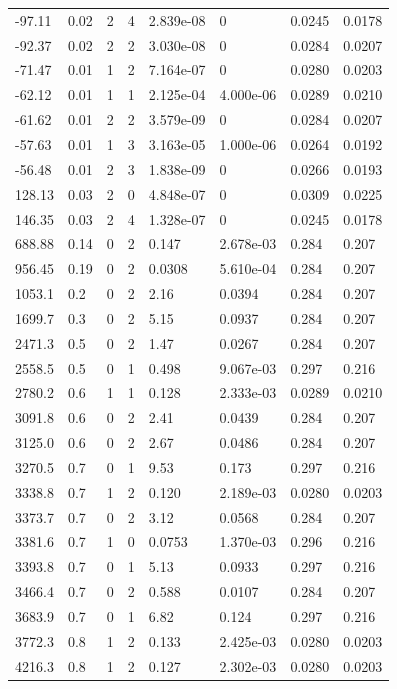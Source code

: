\documentclass[preview]{standalone}
\begin{document}
{{\begin{tabular}{L{1.2cm}C{1.2cm} C{0.3cm}C{0.5cm} C{1.4cm}C{1.4cm} C{1.4cm}C{1.4cm}}
  -97.11  &  0.02  & 2     &  4 &  2.839e-08  & 0  & 0.0245 &  0.0178   \\ 
  -92.37  &  0.02  & 2     &  2 &  3.030e-08  & 0  & 0.0284 &  0.0207   \\ 
  -71.47  &  0.01  & 1     &  2 &  7.164e-07  & 0  & 0.0280 &  0.0203   \\ 
  -62.12  &  0.01  & 1     &  1 &  2.125e-04  & 4.000e-06  & 0.0289 &  0.0210   \\ 
  -61.62  &  0.01  & 2     &  2 &  3.579e-09  & 0  & 0.0284 &  0.0207   \\ 
  -57.63  &  0.01  & 1     &  3 &  3.163e-05  & 1.000e-06  & 0.0264 &  0.0192   \\ 
  -56.48  &  0.01  & 2     &  3 &  1.838e-09  & 0  & 0.0266 &  0.0193   \\ 
  128.13  &  0.03  & 2     &  0 &  4.848e-07  & 0  & 0.0309 &  0.0225   \\ 
  146.35  &  0.03  & 2     &  4 &  1.328e-07  & 0  & 0.0245 &  0.0178   \\ 
  688.88  &  0.14  & 0     &  2 &  0.147  & 2.678e-03  & 0.284 &  0.207   \\ 
  956.45  &  0.19  & 0     &  2 &  0.0308  & 5.610e-04  & 0.284 &  0.207   \\ 
  1053.1  &   0.2  & 0     &  2 &  2.16  & 0.0394  & 0.284 &  0.207   \\ 
  1699.7  &   0.3  & 0     &  2 &  5.15  & 0.0937  & 0.284 &  0.207   \\ 
  2471.3  &   0.5  & 0     &  2 &  1.47  & 0.0267  & 0.284 &  0.207   \\ 
  2558.5  &   0.5  & 0     &  1 &  0.498  & 9.067e-03  & 0.297 &  0.216   \\ 
  2780.2  &   0.6  & 1     &  1 &  0.128  & 2.333e-03  & 0.0289 &  0.0210   \\ 
  3091.8  &   0.6  & 0     &  2 &  2.41  & 0.0439  & 0.284 &  0.207   \\ 
  3125.0  &   0.6  & 0     &  2 &  2.67  & 0.0486  & 0.284 &  0.207   \\ 
  3270.5  &   0.7  & 0     &  1 &  9.53  & 0.173  & 0.297 &  0.216   \\ 
  3338.8  &   0.7  & 1     &  2 &  0.120  & 2.189e-03  & 0.0280 &  0.0203   \\ 
  3373.7  &   0.7  & 0     &  2 &  3.12  & 0.0568  & 0.284 &  0.207   \\ 
  3381.6  &   0.7  & 1     &  0 &  0.0753  & 1.370e-03  & 0.296 &  0.216   \\ 
  3393.8  &   0.7  & 0     &  1 &  5.13  & 0.0933  & 0.297 &  0.216   \\ 
  3466.4  &   0.7  & 0     &  2 &  0.588  & 0.0107  & 0.284 &  0.207   \\ 
  3683.9  &   0.7  & 0     &  1 &  6.82  & 0.124  & 0.297 &  0.216   \\ 
  3772.3  &   0.8  & 1     &  2 &  0.133  & 2.425e-03  & 0.0280 &  0.0203   \\ 
  4216.3  &   0.8  & 1     &  2 &  0.127  & 2.302e-03  & 0.0280 &  0.0203   \\ 
\hline 
\end{tabular} 

}}
\end{document}
